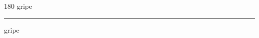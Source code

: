 
\begin{frame}
\begin{center}
\begin{turn}{180}
{\fontsize{2.5cm}{1em}\selectfont gripe}
\end{turn}
\vspace{1em}\par  
\hrule
\vspace{1em}\par  
{\fontsize{2.5cm}{1em}\selectfont gripe}
\end{center}
\end{frame}
